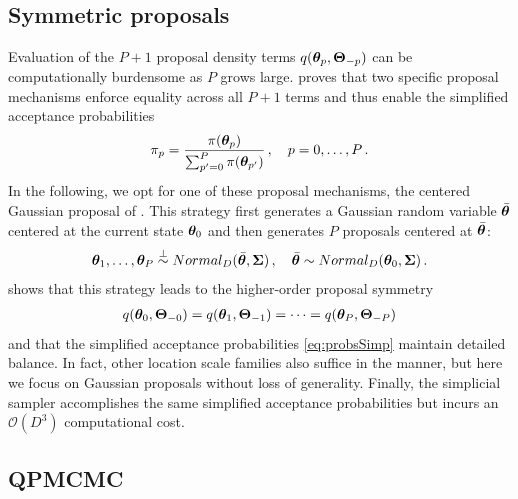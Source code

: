 \documentclass[12pt]{article} %
\begin{document}
\subsection{Symmetric proposals}\label{sec:sym}
\newcommand{\SSigma}{\boldsymbol{\Sigma}}

Evaluation of the $P+1$ proposal density terms $q(\boldsymbol{\theta}_{p},\boldsymbol{\Theta}_{-p})$ can be computationally burdensome as $P$ grows large.  \citet{holbrook2021generating} proves that two specific proposal mechanisms enforce equality across all $P+1$ terms and thus enable the simplified acceptance probabilities
\begin{align}\label{eq:probsSimp}
	\pi_p = \frac{\pi(\boldsymbol{\theta}_p) }{\sum_{p'=0}^P \pi(\boldsymbol{\theta}_{p'})} \, , \quad p=0,\dots,P \, .
\end{align}
In the following, we opt for one of these proposal mechanisms, the centered Gaussian proposal of \citet{tjelmeland2004using}.  This strategy first generates a Gaussian random variable $\bar{\boldsymbol{\theta}}$ centered at the current state $\boldsymbol{\theta}_{0}$ and then generates $P$ proposals centered at $\bar{\boldsymbol{\theta}}$:
\begin{align}\label{eq:p1}
	\ttheta_1,\dots,\ttheta_P \stackrel{\perp}{\sim} Normal_D(\bar{\ttheta},\SSigma) \, , \quad \bar{\ttheta} \sim Normal_D(\ttheta_{0},\SSigma) \, .
\end{align}
\citet{holbrook2021generating} shows that this strategy leads to the higher-order proposal symmetry
\begin{align*}
	q(\boldsymbol{\theta}_0,\boldsymbol{\Theta}_{-0}) = q(\boldsymbol{\theta}_{1},\boldsymbol{\Theta}_{-1}) =\dots =q(\boldsymbol{\theta}_{P},\boldsymbol{\Theta}_{-P})  
\end{align*}
and that the simplified acceptance probabilities \eqref{eq:probsSimp} maintain detailed balance.  In fact, other location scale families also suffice in the manner, but here we focus on Gaussian proposals without loss of generality.  Finally, the simplicial sampler \citep{holbrook2021generating} accomplishes the same simplified acceptance probabilities but incurs an $\mathcal{O}(D^3)$ computational cost.

\subsection{QPMCMC}
\end{document}
